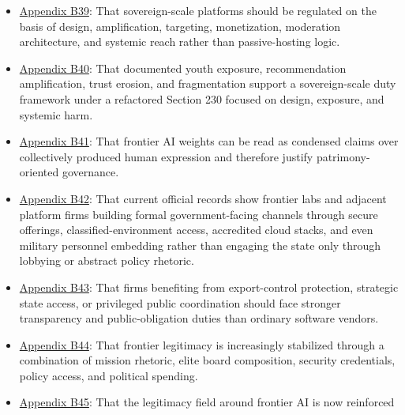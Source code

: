 \documentclass[
  american,
  11pt,
  letterpaper,
]{article}
\providecommand{\tightlist}{%
  \setlength{\itemsep}{0pt}\setlength{\parskip}{0pt}}
\begin{document}
\begin{itemize}
\tightlist
\item
  \hyperref[ch-10-appendix-b39-sovereign-scale-platforms-should-be-regulated-on-the-basis-of-design-amplificati]{Appendix
  B39}: That sovereign-scale platforms should be regulated on the basis
  of design, amplification, targeting, monetization, moderation
  architecture, and systemic reach rather than passive-hosting logic.
\item
  \hyperref[ch-10-appendix-b40-documented-youth-exposure-recommendation-amplification-trust-erosion-and-fragm]{Appendix
  B40}: That documented youth exposure, recommendation amplification,
  trust erosion, and fragmentation support a sovereign-scale duty
  framework under a refactored Section 230 focused on design, exposure,
  and systemic harm.
\item
  \hyperref[ch-10-appendix-b41-frontier-ai-weights-can-be-read-as-condensed-claims-over-collectively-produced-hu]{Appendix
  B41}: That frontier AI weights can be read as condensed claims over
  collectively produced human expression and therefore justify
  patrimony-oriented governance.
\item
  \hyperref[ch-10-appendix-b42-current-official-records-show-frontier-labs-and-adjacent-platform-firms-building]{Appendix
  B42}: That current official records show frontier labs and adjacent
  platform firms building formal government-facing channels through
  secure offerings, classified-environment access, accredited cloud
  stacks, and even military personnel embedding rather than engaging the
  state only through lobbying or abstract policy rhetoric.
\item
  \hyperref[ch-10-appendix-b43-firms-benefiting-from-export-control-protection-strategic-state-access-or-privi]{Appendix
  B43}: That firms benefiting from export-control protection, strategic
  state access, or privileged public coordination should face stronger
  transparency and public-obligation duties than ordinary software
  vendors.
\item
  \hyperref[ch-10-appendix-b44-frontier-legitimacy-is-increasingly-stabilized-through-a-combination-of-mission-r]{Appendix
  B44}: That frontier legitimacy is increasingly stabilized through a
  combination of mission rhetoric, elite board composition, security
  credentials, policy access, and political spending.
\item
  \hyperref[ch-10-appendix-b45-the-legitimacy-field-around-frontier-ai-is-now-reinforced-not-only-by-boards-pol]{Appendix
  B45}: That the legitimacy field around frontier AI is now reinforced

\end{itemize}
\end{document}
